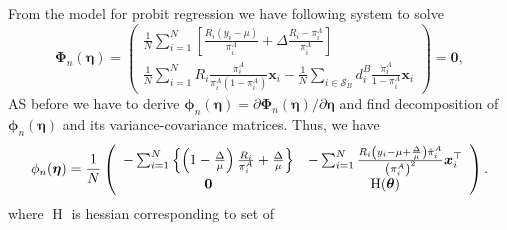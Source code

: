 \documentclass[
  letterpaper,
  DIV=11,
  numbers=noendperiod]{scrreprt}
\begin{document}
From the model for probit regression we have following system to solve
\[
\begin{equation} 
\boldsymbol{\Phi}_n(\boldsymbol{\eta})=\left(\begin{array}{c}
\frac{1}{N} \sum_{i=1}^N\left[\frac{R_i\left(y_i-\mu\right)}{\pi_i^A}+\Delta \frac{R_i-\pi_i^A}{\pi_i^A}\right] \\
\frac{1}{N} \sum_{i=1}^N R_i \frac{\dot{\pi}_i^A}{\pi_i^A\left(1 - \pi_{i}^A\right)} \boldsymbol{x}_i-\frac{1}{N} \sum_{i \in \mathcal{S}_B} d_i^B \frac{\dot{\pi}_i^A}{1 - \pi_i^A} \boldsymbol{x}_i
\end{array}\right)=\mathbf{0},
\end{equation}
\] AS before we have to derive
\(\boldsymbol{\phi}_n(\boldsymbol{\eta})=\partial \boldsymbol{\Phi}_n(\boldsymbol{\eta}) / \partial \boldsymbol{\eta}\)
and find decomposition of \(\boldsymbol{\phi}_n(\boldsymbol{\eta})\) and
its variance-covariance matrices. Thus, we have \[
\begin{equation*}
\phi_n(\boldsymbol{\eta})=\frac{1}{N}\left(\begin{array}{cc}
-\sum_{i=1}^N\left\{\left(1-\frac{\Delta}{\mu}\right) \frac{R_i}{\pi_i^A}+\frac{\Delta}{\mu}\right\} & -\sum_{i=1}^N \frac{R_i\left(y_i-\mu + \frac{\Delta}{\mu}\right)\dot{\pi}_i^A}{\left(\pi_i^A\right)^2} \boldsymbol{x}_i^{\top} \\
\mathbf{0} & \operatorname{H}(\btheta)
\end{array}\right).
\end{equation*}
\] where \(\operatorname{H}\) is hessian corresponding to set of
\end{document}
